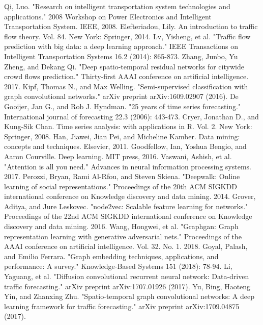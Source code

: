 \documentclass[conference]{IEEEtran}
\begin{document}
\begin{thebibliography}{00}
 Qi, Luo. "Research on intelligent transportation system technologies and applications." 2008 Workshop on Power Electronics and Intelligent Transportation System. IEEE, 2008.
 Elefteriadou, Lily. An introduction to traffic flow theory. Vol. 84. New York: Springer, 2014.
 Lv, Yisheng, et al. "Traffic flow prediction with big data: a deep learning approach." IEEE Transactions on Intelligent Transportation Systems 16.2 (2014): 865-873.
Zhang, Junbo, Yu Zheng, and Dekang Qi. "Deep spatio-temporal residual networks for citywide crowd flows prediction." Thirty-first AAAI conference on artificial intelligence. 2017.
 Kipf, Thomas N., and Max Welling. "Semi-supervised classification with graph convolutional networks." arXiv preprint arXiv:1609.02907 (2016).
 De Gooijer, Jan G., and Rob J. Hyndman. "25 years of time series forecasting." International journal of forecasting 22.3 (2006): 443-473.
 Cryer, Jonathan D., and Kung-Sik Chan. Time series analysis: with applications in R. Vol. 2. New York: Springer, 2008.
 Han, Jiawei, Jian Pei, and Micheline Kamber. Data mining: concepts and techniques. Elsevier, 2011.
 Goodfellow, Ian, Yoshua Bengio, and Aaron Courville. Deep learning. MIT press, 2016.
 Vaswani, Ashish, et al. "Attention is all you need." Advances in neural information processing systems. 2017.
 Perozzi, Bryan, Rami Al-Rfou, and Steven Skiena. "Deepwalk: Online learning of social representations." Proceedings of the 20th ACM SIGKDD international conference on Knowledge discovery and data mining. 2014.
 Grover, Aditya, and Jure Leskovec. "node2vec: Scalable feature learning for networks." Proceedings of the 22nd ACM SIGKDD international conference on Knowledge discovery and data mining. 2016.
 Wang, Hongwei, et al. "Graphgan: Graph representation learning with generative adversarial nets." Proceedings of the AAAI conference on artificial intelligence. Vol. 32. No. 1. 2018.
 Goyal, Palash, and Emilio Ferrara. "Graph embedding techniques, applications, and performance: A survey." Knowledge-Based Systems 151 (2018): 78-94.
 Li, Yaguang, et al. "Diffusion convolutional recurrent neural network: Data-driven traffic forecasting." arXiv preprint arXiv:1707.01926 (2017).
 Yu, Bing, Haoteng Yin, and Zhanxing Zhu. "Spatio-temporal graph convolutional networks: A deep learning framework for traffic forecasting." arXiv preprint arXiv:1709.04875 (2017).

\end{thebibliography}
\end{document}
